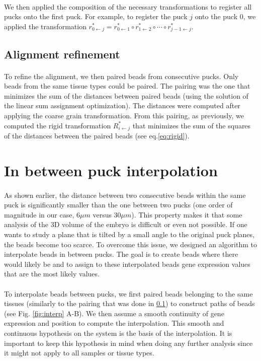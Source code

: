 \documentclass[10pt,a4paper]{article}
\begin{document}
\paragraph{}We then applied the composition of the necessary transformations to register all pucks onto the first puck.
For example, to register the puck \(j\) onto the puck \(0\), we applied the transformation \(r_{0\leftarrow j}^*=r_{0\leftarrow 1}^*\circ r_{1\leftarrow 2}^*\circ \cdots \circ r_{j-1\leftarrow j}^*\).
\subsection{Alignment refinement}\label{subsec:ali-ref}
\paragraph{}To refine the alignment, we then paired beads from consecutive pucks.
Only beads from the same tissue types could be paired.
The pairing was the one that minimizes the sum of the distances between paired beads (using the solution of the linear sum assignment optimization).
The distances were computed after applying the coarse grain transformation.
From this pairing, as previously, we computed the rigid transformation \(R^*_{i\leftarrow j}\) that minimizes the sum of the squares of the distances between the paired beads (see eq.\eqref{eq:rigid}).
\section{In between puck interpolation}
\paragraph{}As shown earlier, the distance between two consecutive beads within the same puck is significantly smaller than the one between two pucks (one order of magnitude in our case, 6\(\mu m\) versus 30\(\mu m\)). This property makes it that some analysis of the 3D volume of the embryo is difficult or even not possible. If one wants to study a plane that is tilted by a small angle to the original puck planes, the beads become too scarce. To overcome this issue, we designed an algorithm to interpolate beads in between pucks. The goal is to create beads where there would likely be and to assign to these interpolated beads gene expression values that are the most likely values.
\paragraph{}To interpolate beads between pucks, we first paired beads belonging to the same tissues (similarly to the pairing that was done in \ref{subsec:ali-ref}) to construct paths of beads (see Fig. \ref{fig:interp} A-B). We then assume a smooth continuity of gene expression and position to compute the interpolation. This smooth and continuous hypothesis on the system is the basis of the interpolation. It is important to keep this hypothesis in mind when doing any further analysis since it might not apply to all samples or tissue types.
\end{document}
